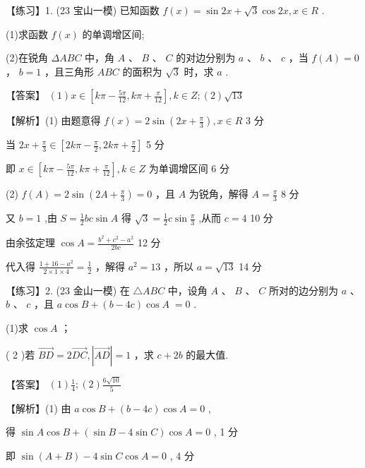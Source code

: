 \documentclass[10pt]{article}
\begin{document}
【练习】1. (23 宝山一模) 已知函数 \(f\left( x\right)  = \sin {2x} + \sqrt{3}\cos {2x},x \in  R\) .

(1)求函数 \(f\left( x\right)\) 的单调增区间;

(2)在锐角 \({\Delta ABC}\) 中，角 \(A\) 、 \(B\) 、 \(C\) 的对边分别为 \(a\) 、 \(b\) 、 \(c\) ，当 \(f\left( A\right)  = 0\) ， \(b = 1\) ，且三角形 \({ABC}\) 的面积为 \(\sqrt{3}\) 时，求 \(a\) .

【答案】 \(\left( 1\right) x \in  \left\lbrack  {{k\pi } - \frac{5\pi }{12},{k\pi } + \frac{\pi }{12}}\right\rbrack  ,k \in  Z;\left( 2\right) \sqrt{13}\)

【解析】(1) 由题意得 \(f\left( x\right)  = 2\sin \left( {{2x} + \frac{\pi }{3}}\right) ,x \in  R\) 3 分

当 \({2x} + \frac{\pi }{3} \in  \left\lbrack  {{2k\pi } - \frac{\pi }{2},{2k\pi } + \frac{\pi }{2}}\right\rbrack\) 5 分

即 \(x \in  \left\lbrack  {{k\pi } - \frac{5\pi }{12},{k\pi } + \frac{\pi }{12}}\right\rbrack  ,k \in  Z\) 为单调增区间 6 分

(2) \(f\left( A\right)  = 2\sin \left( {{2A} + \frac{\pi }{3}}\right)  = 0\) ，且 \(A\) 为锐角，解得 \(A = \frac{\pi }{3}\) 8 分

又 \(b = 1\) ,由 \(S = \frac{1}{2}{bc}\sin A\) 得 \(\sqrt{3} = \frac{1}{2}c\sin \frac{\pi }{3}\) ,从而 \(c = 4\) 10 分

由余弦定理 \(\cos A = \frac{{b}^{2} + {c}^{2} - {a}^{2}}{2bc}\) 12 分

代入得 \(\frac{1 + {16} - {a}^{2}}{2 \times  1 \times  4} = \frac{1}{2}\) ，解得 \({a}^{2} = {13}\) ，所以 \(a = \sqrt{13}\) 14 分

【练习】2. (23 金山一模) 在 \(\bigtriangleup  {ABC}\) 中，设角 \(A\) 、 \(B\) 、 \(C\) 所对的边分别为 \(a\) 、 \(b\) 、 \(c\) ，且 \(a\cos B + \left( {b - {4c}}\right) \cos A \; = 0\) .

(1)求 \(\cos A\) ；

( 2 )若 \(\overrightarrow{BD} = 2\overrightarrow{DC},\left| \overrightarrow{AD}\right|  = 1\) ，求 \(c + {2b}\) 的最大值.

【答案】 \(\left( 1\right) \frac{1}{4};\left( 2\right) \frac{6\sqrt{10}}{5}\)

【解析】(1) 由 \(a\cos B + \left( {b - {4c}}\right) \cos A = 0\) ,

得 \(\sin A\cos B + \left( {\sin B - 4\sin C}\right) \cos A = 0\) , 1 分

即 \(\sin \left( {A + B}\right)  - 4\sin C\cos A = 0\) , 4 分
\end{document}
